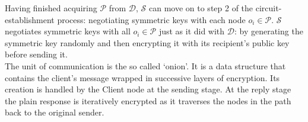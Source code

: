 \documentclass[10pt]{report}
\begin{document}
Having finished acquiring $\mathcal{P}$ from $\mathcal{D}$, $\mathcal{S}$ can move on to step 2 of the
circuit-establishment process: negotiating symmetric keys with each node $o_i \in \mathcal{P}$.
$\mathcal{S}$ negotiates symmetric keys with all $o_i \in \mathcal{P}$ just as it did with $\mathcal{D}$:
by generating the symmetric key randomly and then encrypting it with its recipient's public key before
sending it.\\

The unit of communication is the so called ‘onion’. It is a data structure that contains the client’s message wrapped in successive layers of encryption.
Its creation is handled by the Client node at the sending stage. At the reply stage the plain response is iteratively encrypted as it traverses the nodes in the path back to the original sender.\\
\end{document}

